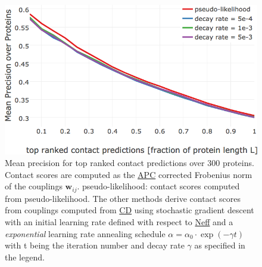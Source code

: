 \documentclass[11pt,a4paper,twoside]{book}
\newcommand{\wij}{\mathbf{w}_{ij}}
\theoremstyle{definition}
\theoremstyle{definition}
\theoremstyle{remark}
\begin{document}
\begin{figure}

{\centering \includegraphics[width=0.85\linewidth]{img/full_likelihood/appendix/precision_vs_rank_alpha0_0_exp_decayrate} 

}

\caption{Mean precision for top ranked
contact predictions over 300 proteins. Contact scores are computed as
the \protect\hyperlink{abbrev}{APC} corrected Frobenius norm of the
couplings \(\wij\). pseudo-likelihood: contact scores computed from
pseudo-likelihood. The other methods derive contact scores from
couplings computed from \protect\hyperlink{abbrev}{CD} using stochastic
gradient descent with an initial learning rate defined with respect to
\protect\hyperlink{abbrev}{Neff} and a \emph{exponential} learning rate
annealing schedule \(\alpha = \alpha_0 \cdot\exp(- \gamma t)\) with t
being the iteration number and decay rate \(\gamma\) as specified in the
legend.}\label{fig:performance-cd-expschedule}
\end{figure}
\end{document}
